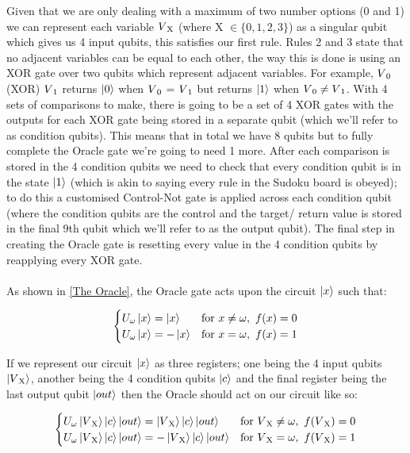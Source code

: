 \documentclass{article}
\begin{document}
Given that we are only dealing with a maximum of two number options (0 and 1) we can represent each variable $V\textsubscript{X}$ (where X $\in \{0, 1, 2, 3\}$) as a singular qubit which gives us 4 input qubits, this satisfies our first rule. 
Rules 2 and 3 state that no adjacent variables can be equal to each other, the way this is done is using an XOR gate over two qubits which represent adjacent variables. For example, $V\textsubscript{0}$ (XOR) $V\textsubscript{1}$ returns $\ket{0}$ when $V\textsubscript{0}$ = $V\textsubscript{1}$ but returns $\ket{1}$ when $V\textsubscript{0} \neq V\textsubscript{1}$. With 4 sets of comparisons to make, there is going to be a set of 4 XOR gates with the outputs for each XOR gate being stored in a separate qubit (which we'll refer to as condition qubits). This means that in total we have 8 qubits but to fully complete the Oracle gate we're going to need 1 more. After each comparison is stored in the 4 condition qubits we need to check that every condition qubit is in the state $\ket{1}$ (which is akin to saying every rule in the Sudoku board is obeyed); to do this a customised Control-Not gate is applied across each condition qubit (where the condition qubits are the control and the target/ return value is stored in the final 9th qubit which we'll refer to as the output qubit). The final step in creating the Oracle gate is resetting every value in the 4 condition qubits by reapplying every XOR gate.  
\\ \\
As shown in \ref{The Oracle}, the Oracle gate acts upon the circuit $\ket{x}$ such that:

\begin{equation}
\begin{cases}
      U_{\omega}\ket{x} = \ket{x}  & \text{for} \ x \neq \omega, \ f(x) = 0 \\
      U_{\omega}\ket{x} = -\ket{x}  & \text{for} \ x = \omega, \ f(x) =1 \\
\end{cases}  
\end{equation}

If we represent our circuit $\ket{x}$ as three registers; one being the 4 input qubits $\ket{V\textsubscript{X}}$, another being the 4 condition qubits $\ket{c}$ and the final register being the last output qubit $\ket{out}$ then the Oracle should act on our circuit like so:

\begin{equation}
\begin{cases}
      U_{\omega}\ket{V\textsubscript{X}}\ket{c}\ket{out} = \ket{V\textsubscript{X}}\ket{c}\ket{out}  & \text{for} \ V\textsubscript{X} \neq \omega, \ f(V\textsubscript{X}) = 0 \\
      U_{\omega}\ket{V\textsubscript{X}}\ket{c}\ket{out} = -\ket{V\textsubscript{X}}\ket{c}\ket{out}  & \text{for} \ V\textsubscript{X} = \omega, \ f(V\textsubscript{X}) =1 \\
       
\end{cases}  
\end{equation}
\end{document}
